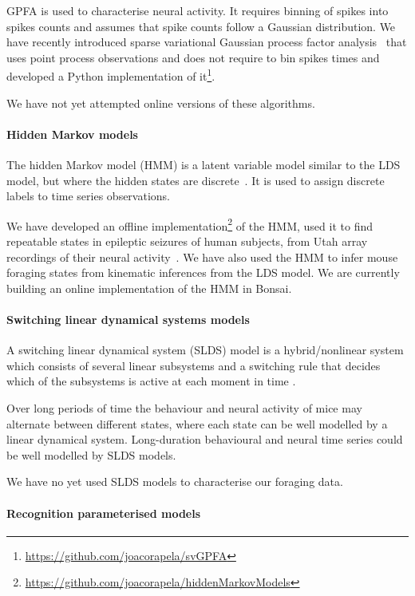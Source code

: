 GPFA is used to characterise neural activity. It requires binning of spikes
into spikes counts and assumes that spike counts follow a Gaussian
distribution. We have recently introduced sparse variational Gaussian process
factor analysis~\citep[svGPFA,][]{dunckerAndSahani18} that uses point process observations
and does not require to bin spikes times and developed a Python implementation
of it\footnote{\url{https://github.com/joacorapela/svGPFA}}.

We have not yet attempted online versions of these algorithms.

\paragraph{Hidden Markov models}

The hidden Markov model (HMM) is a latent variable model similar to the LDS
model, but where the hidden states are discrete~\citep[][Chapter 13]{bishop06}. It is
used to assign discrete labels to time series observations.

We have developed an offline
implementation\footnote{\url{https://github.com/joacorapela/hiddenMarkovModels}}
of the HMM, used it to find repeatable states in epileptic seizures of human
subjects, from Utah array recordings of their neural
activity~\citep{rapelaAndTodorov19-epilepsy-hmm}. We have also used the HMM to
infer mouse foraging states from kinematic inferences from the LDS model. We
are currently building an online implementation of the HMM in Bonsai.

\paragraph{Switching linear dynamical systems models}

A switching linear dynamical system (SLDS) model is a hybrid/nonlinear system which
consists of several linear subsystems and a switching rule that decides which
of the subsystems is active at each moment in time \citep[Section
18.6]{murphy12}.

Over long periods of time the behaviour and neural activity of mice may
alternate between different states, where each state can be well modelled by a
linear dynamical system. Long-duration behavioural and neural time series could
be well modelled by SLDS models.

We have no yet used SLDS models to characterise our foraging data.

\paragraph{Recognition parameterised models}

